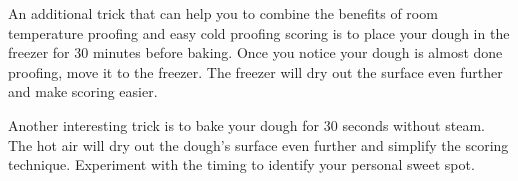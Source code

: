 An additional trick that can help you to combine the benefits
of room temperature proofing and easy cold proofing scoring
is to place your dough in the freezer for 30 minutes before baking.
Once you notice your dough is almost done proofing, move it to the
freezer. The freezer will dry out the surface even further and make
scoring easier.

Another interesting trick is to bake your dough for 30 seconds without steam.
The hot air will dry out the dough's surface even further and simplify
the scoring technique. Experiment with the timing to identify your personal
sweet spot.

